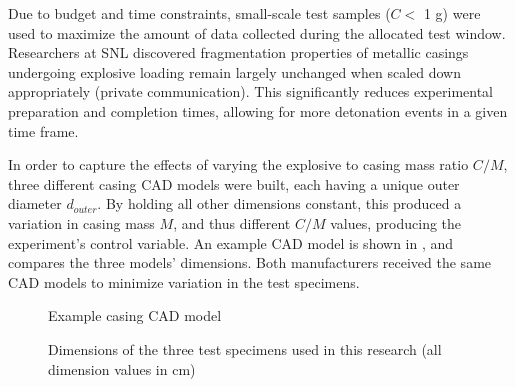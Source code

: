 Due to budget and time constraints, small-scale test samples ($C <$ 1 g) were used to maximize the amount of data collected during the allocated test window. Researchers at \gls{SNL} discovered fragmentation properties of metallic casings undergoing explosive loading remain largely unchanged when scaled down appropriately (private communication). This significantly reduces experimental preparation and completion times, allowing for more detonation events in a given time frame. 

In order to capture the effects of varying the explosive to casing mass ratio $C/M$, three different casing \gls{CAD} models were built, each having a unique outer diameter $d_{outer}$. By holding all other dimensions constant, this produced a variation in casing mass $M$, and thus different $C/M$ values, producing the experiment's control variable. An example \gls{CAD} model is shown in , and  compares the three models' dimensions. Both manufacturers received the same \gls{CAD} models to minimize variation in the test specimens.

\begin{figure}[H]
	\centering
    \caption{Example casing \gls{CAD} model}
	\label{fig:3_Casing_CAD_model}
\end{figure}
%
%
\begin{figure}[H]
	\centering
    \caption{Dimensions of the three test specimens used in this research (all dimension values in cm)}
	\label{fig:3_Casing_dimensions}
\end{figure}
%

